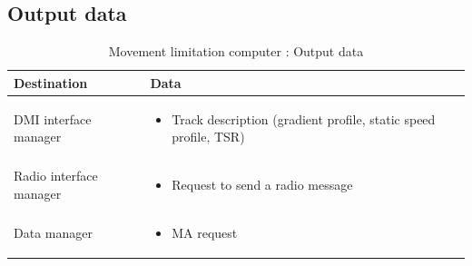 \documentclass[nocc]{template/openetcs_report}
\begin{document}
\subsection{Output data}
			\begin{longtable}{|l|l|}
				\caption{Movement limitation computer : Output data}\\ 
				\hline
				
					\begin{minipage}[t]{0.35\linewidth} \textbf{Destination}	\end{minipage} 
				&	\begin{minipage}[t]{0.65\linewidth} \textbf{Data} \end{minipage} \\
				
				\hline
																																									
					\begin{minipage}[t]{0.35\linewidth} DMI interface manager	\end{minipage} 
				&	\begin{minipage}[t]{0.65\linewidth}
						\begin{itemize}
							\item Track description (gradient profile, static speed profile, TSR)
						\end{itemize}
					\end{minipage} \\
				
				\hline
				
					\begin{minipage}[t]{0.35\linewidth} Radio interface manager	\end{minipage} 
				&	\begin{minipage}[t]{0.65\linewidth}
						\begin{itemize}
							\item Request to send a radio message
						\end{itemize}			
					\end{minipage} \\
				
				\hline
					
					\begin{minipage}[t]{0.35\linewidth} Data manager	\end{minipage} 
				&	\begin{minipage}[t]{0.65\linewidth}
						\begin{itemize}
							\item MA request
						\end{itemize}			
					\end{minipage} \\
				

\end{longtable}
\end{document}
